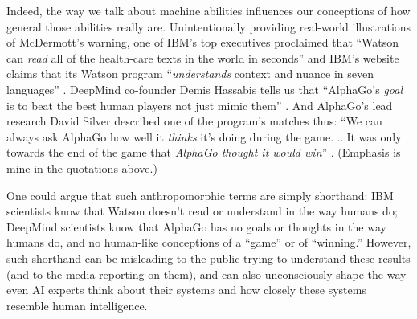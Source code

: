 \documentclass{article}
\begin{document}
Indeed, the way we talk about machine abilities influences our conceptions of how general those abilities really are.  Unintentionally providing real-world illustrations of McDermott's warning, one of IBM's top executives proclaimed that ``Watson can \textit{read} all of the health-care texts in the world in seconds'' \cite{Gustin2011} and IBM's website claims that its Watson program ``\textit{understands} context and nuance in seven languages'' \cite{IBMCognitive}. DeepMind co-founder Demis Hassabis tells us that ``AlphaGo's \textit{goal} is to beat the best human players not just mimic them'' \cite{KoreaHerald2016}. And AlphaGo's lead research David Silver described one of the program's matches thus: ``We can always ask AlphaGo how well it \textit{thinks} it's doing during the game. ...It was only towards the end of the game that \textit{AlphaGo thought it would win}''  \cite{Shead2017}. (Emphasis is mine in the quotations above.) 

One could argue that such anthropomorphic terms are simply shorthand: IBM scientists know that Watson doesn't read or understand in the way humans do; DeepMind scientists know that AlphaGo has no goals or thoughts in the way humans do, and no human-like conceptions of a ``game'' or of ``winning.'' However, such shorthand can be misleading to the public trying to understand these results (and to the media reporting on them), and can also unconsciously shape the way even AI experts think about their systems and how closely these systems resemble human intelligence.
\end{document}

